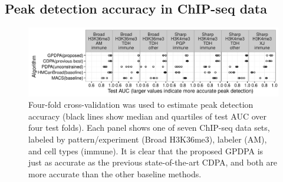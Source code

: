 \documentclass[twoside,11pt]{article}
\begin{document}


\subsection{Peak detection accuracy in ChIP-seq data}


\begin{figure}[t!]
  \centering 
  \includegraphics[width=\textwidth]{figure-all-cv}
  \vskip -0.5cm
  \caption{Four-fold cross-validation was used to estimate peak
    detection accuracy (black lines show median and quartiles of test
    AUC over four test folds). Each panel shows one of seven ChIP-seq data
    sets, labeled by pattern/experiment (Broad H3K36me3), labeler
    (AM), and cell types (immune).  It is clear that the proposed
    GPDPA is just as accurate as the previous state-of-the-art CDPA,
    and both are more accurate than the other baseline methods.
  }
  \label{fig:test-error-dots}
\end{figure}
\end{document}
